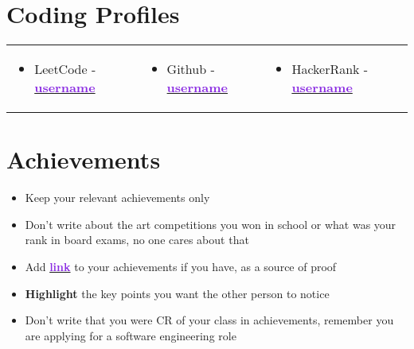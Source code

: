 \documentclass[a4paper,11pt]{article}
\newcommand{\resumeItem}[1]{
  \item\small{
    {#1 \vspace{-2pt}}
  }
}
\newcommand{\resumeItemListStart}{\begin{itemize}}
\newcommand{\resumeItemListEnd}{\end{itemize}\vspace{-5pt}}
\begin{document}

\section{Coding Profiles}
\renewcommand{\arraystretch}{0}
\begin{tabular}{p{}p{}p{}}
  \begin{itemize}[leftmargin=*, topsep=0pt]
    \item LeetCode - \href{https://leetcode.com/username}{\textbf{\textcolor{BlueViolet}{username}}}
  \end{itemize} &
  \begin{itemize}[leftmargin=*, topsep=0pt]
    \item Github - \href{https://github.com/username}{\textbf{\textcolor{BlueViolet}{username}}}
  \end{itemize} &
  \begin{itemize}[leftmargin=*, topsep=0pt]
    \item HackerRank - \href{https://www.hackerrank.com/username}{\textbf{\textcolor{BlueViolet}{username}}}
  \end{itemize} \\
\end{tabular}



\section{Achievements}
\resumeItemListStart
    \resumeItem{Keep your relevant achievements only}
    \resumeItem{Don't write about the art competitions you won in school or what was your rank in board exams, no one cares about that}
    \resumeItem{Add \href{https://google.com/}{\textcolor{BlueViolet}{\textbf{link}}} to your achievements if you have, as a source of proof}
    \resumeItem{\textbf{Highlight} the key points you want the other person to notice}
    \resumeItem{Don't write that you were CR of your class in achievements, remember you are applying for a software engineering role}
\resumeItemListEnd

\end{document}
